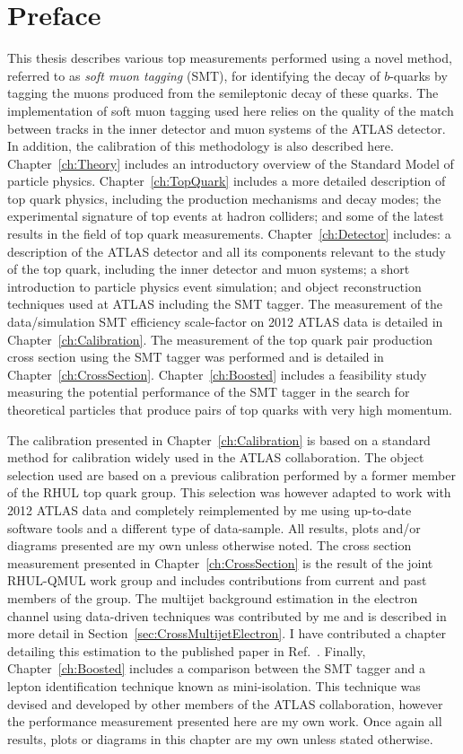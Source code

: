 \thispagestyle{empty}
\vspace{1cm}
\chapter*{Preface}
This thesis describes various top measurements performed using a novel method, referred to as \emph{soft muon tagging} (SMT), for identifying the decay of $b$-quarks by tagging the muons produced from the semileptonic decay of these quarks. The implementation of soft muon tagging used here relies on the quality of the match between tracks in the inner detector and muon systems of the ATLAS detector. In addition, the calibration of this methodology is also described here.
Chapter~\ref{ch:Theory} includes an introductory overview of the Standard Model of particle physics. Chapter~\ref{ch:TopQuark} includes a more detailed description of top quark physics, including the production mechanisms and decay modes; the experimental signature of top events at hadron colliders; and some of the latest results in the field of top quark measurements. Chapter~\ref{ch:Detector} includes: a description of the ATLAS detector and all its components relevant to the study of the top quark, including the inner detector and muon systems; a short introduction to particle physics event simulation; and object reconstruction techniques used at ATLAS including the SMT tagger. The measurement of the data/simulation SMT efficiency scale-factor on 2012 ATLAS data is detailed in Chapter~\ref{ch:Calibration}. The measurement of the top quark pair production cross section using the SMT tagger was performed and is detailed in Chapter~\ref{ch:CrossSection}. Chapter~\ref{ch:Boosted} includes a feasibility study measuring the potential performance of the SMT tagger in the search for theoretical particles that produce pairs of top quarks with very high momentum.

The calibration presented in Chapter~\ref{ch:Calibration} is based on a standard method for calibration widely used in the ATLAS collaboration. The object selection used are based on a previous calibration performed by a former member of the RHUL top quark group. This selection was however adapted to work with 2012 ATLAS data and completely reimplemented by me using up-to-date software tools and a different type of data-sample. All results, plots and/or diagrams presented are my own unless otherwise noted. The cross section measurement presented in Chapter~\ref{ch:CrossSection} is the result of the joint RHUL-QMUL work group and includes contributions from current and past members of the group. The multijet background estimation in the electron channel using data-driven techniques was contributed by me and is described in more detail in Section~\ref{sec:CrossMultijetElectron}. I have contributed a chapter detailing this estimation to the published paper in Ref.~\cite{Cross:SMTCrossSectionPaper}. Finally, Chapter~\ref{ch:Boosted} includes a comparison between the SMT tagger and a lepton identification technique known as mini-isolation. This technique was devised and developed by other members of the ATLAS collaboration, however the performance measurement presented here are my own work. Once again all results, plots or diagrams in this chapter are my own unless stated otherwise.
